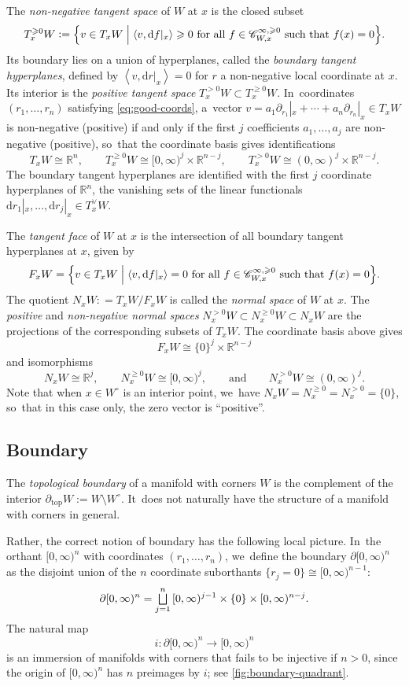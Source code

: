 \documentclass[JEP,XML,SOM,Unicode,NoFloatCountersInSection,published]{cedram}
\let\oldbigsqcup\bigsqcup
\renewcommand{\bigsqcup}{\mathop{\textstyle\oldbigsqcup}\displaylimits}
\newcommand{\Bset}[2]{\Bigl\{#1\Bigm|#2\Bigr\}}
\theoremstyle{definition}
\theoremstyle{remark}
\let\defn\emph
\newcommand{\RR}{\mathbb{R}}
\newcommand{\halfspc}[1]{[0,\infty)^{#1}}
\renewcommand{\ge}{\geqslant}
\newcommand{\defas}{\mathrel{\mathop:}=}
\newcommand{\abrac}[1]{\left\langle#1\right\rangle}
\newcommand{\Cinfge}[1]{\mathscr{C}^{\infty, \ge 0}_{#1}}
\newcommand{\dd}{\mathrm{d}}
\newcommand{\cvf}[1]{\partial_{#1}}
\newcommand{\tb}[2][]{T_{#1}#2}
\newcommand{\tbpos}[2][]{T^{>0}_{#1}#2}
\newcommand{\tbge}[2][]{T^{\ge0}_{#1}#2}
\newcommand{\ctb}[2][]{T^\vee_{#1}#2}
\begin{document}
The \defn{non-negative tangent space} of $W$ at $x$ is the closed subset
\[
\tbge[x]{W} \defas \Bset{v \in \tb[x]{W}}{\abrac{v,\dd f|_x} \ge 0 \textrm{ for all } f \in \Cinfge{W,x} \textrm{ such that $f(x)=0$}}.
\]
Its boundary lies on a union of hyperplanes, called the \defn{boundary tangent hyperplanes}, defined by $\abrac{v,\dd r|_x}=0$ for $r$ a non-negative local coordinate at $x$. Its interior is the \defn{positive tangent space} $\tbpos[x]{W} \subset \tbge[x]{W}$. In~coordinates $(r_1,\ldots,r_n)$ satisfying \eqref{eq:good-coords}, a~vector $v =a_1\cvf{r_1}|_x+\cdots +a_n\cvf{r_n}|_x \in \tb[x]{W}$ is non-negative (\resp positive) if and only if the first $j$ coefficients $a_1,\ldots,a_j$ are non-negative (\resp positive), so~that the coordinate basis gives identifications
\[
T_xW\cong \RR^n, \qquad T_x^{\ge 0}W \cong \halfspc{j}\times \RR^{n-j}, \qquad T_x^{>0}W\cong (0,\infty)^j\times \RR^{n-j}.
\]
The boundary tangent hyperplanes are identified with the first $j$ coordinate hyperplanes of $\RR^n$, \ie the vanishing sets of the linear functionals $\dd r_1|_x,\ldots,\dd r_j|_x\in \ctb[x]{W}$.

The \defn{tangent face} of $W$ at $x$ is the intersection of all boundary tangent hyperplanes at $x$, given by
\[
F_x W = \Bset{v \in \tb[x]{W}}{\abrac{v,\dd f|_x} = 0\textrm{ for all } f\in \Cinfge{W,x}\textrm{ such that }f(x)=0}.
\]
The quotient $N_x W\defas T_x W/F_x W$ is called the \defn{normal space} of $W$ at $x$. The \defn{positive} and \defn{non-negative normal spaces} $N_x^{>0}W\subset N_x^{\ge 0}W\subset N_xW$ are the projections of the corresponding subsets of $\tb[x]{W}$. The coordinate basis above gives
\[
F_x W\cong \{0\}^j\times \RR^{n-j}
\] and isomorphisms
\[
N_x W\cong \RR^j, \qquad N_x^{\ge 0} W \cong \halfspc{j}, \qquad \textrm{and} \qquad N_x^{>0} W \cong (0,\infty)^j.
\]
Note that when $x \in W^\circ$ is an interior point, we~have $N_xW=N_x^{\ge0}=N_x^{>0} = \{0\}$, so~that in this case only, the zero vector is ``positive''.

\subsection{Boundary}\label{sec:boundary-manifolds-with-corners}
The \defn{topological boundary} of a manifold with corners $W$ is the complement of the interior $\partial_{\mathrm{top}} W := W \setminus W^\circ$. It~does not naturally have the structure of a manifold with corners in general.

Rather, the correct notion of boundary has the following local picture. In~the orthant $\halfspc{n}$ with coordinates $(r_1,\ldots,r_n)$, we~define the boundary $\partial\halfspc{n}$ as the disjoint union of the $n$ coordinate suborthants $\{r_j=0\}\cong \halfspc{n-1}$:
\[
\partial\halfspc{n} = \bigsqcup_{j=1}^n\,\halfspc{j-1}\times\{0\}\times \halfspc{n-j}.
\]
The natural map
\[
i\colon \partial\halfspc{n}\to \halfspc{n}
\]
is an immersion of manifolds with corners that fails to be injective if $n>0$, since the origin of $\halfspc{n}$ has $n$ preimages by $i$; see \autoref{fig:boundary-quadrant}.
\end{document}
